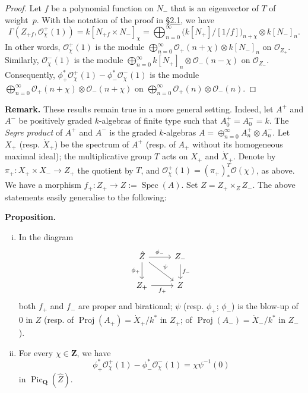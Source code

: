 \documentclass{article}
\newenvironment{itenv}[1]
  {\phantomsection\par\medskip\noindent\textbf{#1.}\itshape}
  {\par\medskip}
\newenvironment{rmenv}[1]
  {\phantomsection\par\medskip\noindent\textbf{#1.}\rmfamily}
  {\par\medskip}
\newcommand{\scr}[1]{{\mathscr{#1}}}
\newcommand{\QQ}{\mathbf{Q}}
\newcommand{\ZZ}{\mathbf{Z}}
\DeclareMathOperator{\Pic}{Pic}
\DeclareMathOperator{\Spec}{Spec}
\DeclareMathOperator{\Proj}{Proj}
\newcommand{\oldpage}[1]{\marginpar{\footnotesize$\Big\vert$ \textit{p.~#1}}}
\begin{document}
\begin{proof}
  Let $f$ be a polynomial function on $N_-$ that is an eigenvector of $T$ of weight~$p$.
  With the notation of the proof in \hyperref[2.1]{\S2.1}, we have
  \[
    \Gamma(Z_{+f},\scr{O}_\chi^+(1))
    = k[N_{+f}\times N_-]_\chi
    = \bigoplus_{n=0}^\infty\big(k[N_+]/[1/f]\big)_{n+\chi}\otimes k[N_-]_n.
  \]
  In other words, $\scr{O}_\chi^+(1)$ is the module $\bigoplus_{n=0}^\infty\scr{O}_+(n+\chi)\otimes k[N_-]_n$ on $\scr{O}_{Z_+}$.
  Similarly, $\scr{O}_\chi^-(1)$ is the module $\bigoplus_{n=0}^\infty k[N_+]_n\otimes\scr{O}_-(n-\chi)$ on $\scr{O}_{Z_-}$.
  Consequently, $\phi_+^*\scr{O}_\chi^+(1)-\phi_-^*\scr{O}_\chi^-(1)$ is the module $\bigoplus_{n=0}^\infty\scr{O}_+(n+\chi)\otimes\scr{O}_-(n+\chi)$ on $\bigoplus_{n=0}^\infty\scr{O}_+(n)\otimes\scr{O}_-(n)$.
\end{proof}

\begin{rmenv}{Remark}
  These results remain true in a more general setting.
  Indeed, let $A^+$ and $A^-$ be positively graded $k$-algebras of finite type such that $A_0^+=A_0^-=k$.
  The \emph{Segre product} \cite[Chapter~4]{GW} of $A^+$ and $A^-$ is the graded $k$-algebras $A=\oplus_{n=0}^\infty A_n^+\otimes A_n^-$.
  Let $X_+$ (resp. $\dot{X}_+$) be the spectrum of $A^+$ (resp. of $A_+$ without its homogeneous maximal ideal);
  the multiplicative group $T$ acts on $X_+$ and $\dot{X}_+$.
  Denote by $\pi_+\colon X_+\times X_-\to Z_+$ the quotient by $T$, and $\scr{O}_\chi^+(1)=(\pi_+)_*^T\scr{O}(\chi)$, as above.
  We have a morphism $f_+\colon Z_+\to Z:=\Spec(A)$.
  Set $\hat{Z}=Z_+\times_Z Z_-$.
  The above statements easily generalise to the following:
\end{rmenv}

\oldpage{521}

\begin{itenv}{Proposition}
  \begin{enumerate}[(i)]
    \item In the diagram
      \[
        \begin{tikzcd}
          \hat{Z} \ar[r,"\phi_-"] \ar[d,swap,"\phi_+"] \ar[dr,"\psi"]
          & Z_- \ar[d,"f_-"]
        \\Z_+ \ar[r,swap,"f_+"]
          & Z
        \end{tikzcd}
      \]
      both $f_+$ and $f_-$ are proper and birational;
      $\psi$ (resp. $\phi_+$; $\phi_-$) is the blow-up of $0$ in $Z$ (resp. of $\Proj(A_+)=\dot{X}_+/k^*$ in $Z_+$; of $\Proj(A_-)=\dot{X}_-/k^*$ in $Z_-$).
    \item For every $\chi\in\ZZ$, we have
      \[
        \phi_+^*\scr{O}_\chi^+(1) - \phi_-^*\scr{O}_\chi^-(1)
        = \chi\psi^{-1}(0)
      \]
      in $\Pic_{\QQ}(\hat{Z})$.
  \end{enumerate}
\end{itenv}
\end{document}
